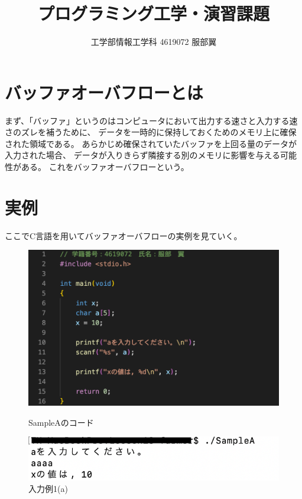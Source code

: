 \documentclass[12pt]{jarticle}
\title{プログラミング工学・演習課題}
\author{工学部情報工学科 4619072 服部翼}
\begin{document}
\maketitle
\section{バッファオーバフローとは}
まず、「バッファ」というのはコンピュータにおいて出力する速さと入力する速さのズレを補うために、
データを一時的に保持しておくためのメモリ上に確保された領域である。
あらかじめ確保されていたバッファを上回る量のデータが入力された場合、
データが入りきらず隣接する別のメモリに影響を与える可能性がある。
これをバッファオーバフローという。
\section{実例}
ここでC言語を用いてバッファオーバフローの実例を見ていく。\\

\begin{figure}
    \begin{minipage}[t]{0.5\columnwidth}
        \begin{center}
            \includegraphics[clip, width=0.9\columnwidth]{SampleA.png}
        \end{center}
        \caption{SampleAのコード}
        \label{fig:left}
    \end{minipage}
    \begin{minipage}[t]{0.5\columnwidth}
        \begin{center}
            \includegraphics[clip, width=0.9\columnwidth]{A_4.png}
        \end{center}
        \caption{入力例1(a)}
        \label{fig:right}
    \end{minipage}
\end{figure}
\end{document}
